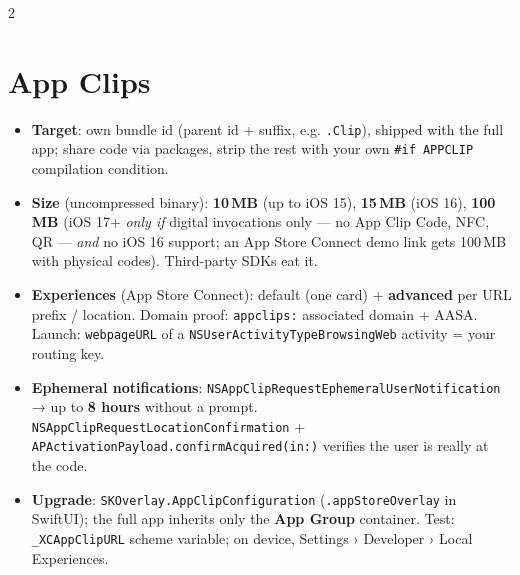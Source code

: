 \documentclass[8pt]{extarticle}
\begin{document}
\begin{multicols}{2}
\raggedright

\section{App Clips}
\begin{itemize}
  \item \textbf{Target}: own bundle id (parent id + suffix, e.g. \texttt{.Clip}), shipped with the full app; share code via
        packages, strip the rest with your own \texttt{\#if APPCLIP} compilation condition.
  \item \textbf{Size} (uncompressed binary): \textbf{10\,MB} (up to iOS 15), \textbf{15\,MB} (iOS 16), \textbf{100\,MB}
        (iOS 17+ \emph{only if} digital invocations only — no App Clip Code, NFC, QR — \emph{and} no iOS 16 support;
        an App Store Connect demo link gets 100\,MB with physical codes). Third-party SDKs eat it.
  \item \textbf{Experiences} (App Store Connect): default (one card) + \textbf{advanced} per URL prefix / location.
        Domain proof: \texttt{appclips:} associated domain + AASA. Launch: \texttt{webpageURL} of a
        \texttt{NSUserActivityTypeBrowsingWeb} activity = your routing key.
  \item \textbf{Ephemeral notifications}: \texttt{NSAppClipRequestEphemeralUserNotification} → up to \textbf{8 hours}
        without a prompt. \texttt{NSAppClipRequestLocationConfirmation} + \texttt{APActivationPayload.confirmAcquired(in:)}
        verifies the user is really at the code.
  \item \textbf{Upgrade}: \texttt{SKOverlay.AppClipConfiguration} (\texttt{.appStoreOverlay} in SwiftUI); the full app
        inherits only the \textbf{App Group} container. Test: \texttt{\_XCAppClipURL} scheme variable; on device,
        Settings › Developer › Local Experiences.
\end{itemize}


\end{multicols}
\end{document}
